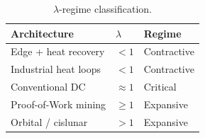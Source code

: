 \documentclass[10pt,twocolumn]{article}
\theoremstyle{plain}
\theoremstyle{definition}
\theoremstyle{remark}
\begin{document}
\begin{table}[t]
\centering
\caption{$\lambda$-regime classification.}
\label{tab:regimes}
\small
\begin{tabular}{p{2.1cm}p{0.9cm}p{1.7cm}}
\toprule
Architecture & $\lambda$ & Regime \\
\midrule
Edge + heat recovery & $<1$ & Contractive \\
Industrial heat loops & $<1$ & Contractive \\
Conventional DC & ${\approx}1$ & Critical \\
Proof-of-Work mining & $\geq 1$ & Expansive \\
Orbital / cislunar & $>1$ & Expansive \\
\bottomrule
\end{tabular}
\end{table}
\end{document}
